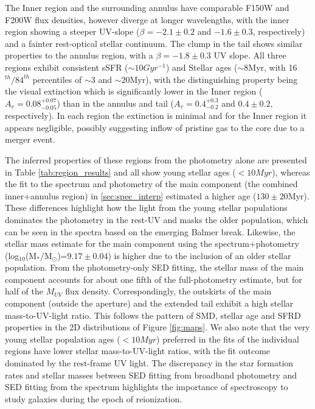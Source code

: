 \documentclass[sn-mathphys]{sn-jnl}%
\theoremstyle{thmstyleone}%
\theoremstyle{thmstyletwo}%
\theoremstyle{thmstylethree}%
\begin{document}
The Inner region and the surrounding annulus have comparable F150W and F200W flux densities, however diverge at longer wavelengths, with the inner region showing a steeper UV-slope ($\beta=-2.1\pm0.2$ and $-1.6\pm0.3$, respectively) and a fainter rest-optical stellar continuum. The clump in the tail shows similar properties to the annulus region, with a $\beta=-1.8\pm0.3$ UV slope.
All three regions exhibit consistent sSFR ($\sim10Gyr^{-1}$) and Stellar ages ($\sim8$Myr, with 16$^{th}/84^{th}$ percentiles of $\sim3$ and $\sim20$Myr), with the distinguishing property being the visual extinction which is significantly lower in the Inner region ($A_v = 0.08^{+0.07}_{-0.05}$) than in the annulus and tail ($A_v = 0.4^{+0.3}_{-0.2}$ and $0.4\pm0.2$, respectively). 
In each region the extinction is minimal and for the Inner region it appears negligible, possibly suggesting inflow of pristine gas to the core due to a merger event. 

The inferred properties of these regions from the photometry alone are presented in Table \ref{tab:region_results} and all show young stellar ages ($<10Myr$), whereas the fit to the spectrum and photometry of the main component (the combined inner+annulus region) in \ref{sec:spec_interp} estimated a higher age ($130\pm20$Myr). These differences highlight how the light from the young stellar populations dominates the photometry in the rest-UV and masks the older population, which can be seen in the spectra based on the emerging Balmer break.
Likewise, the stellar mass estimate for the main component using the spectrum+photometry (log$_{10}$(M$_*/$M$_\odot$)=$9.17\pm0.04$) is higher due to the inclusion of an older stellar population. 
From the photometry-only SED fitting, the stellar mass of the main component accounts for about one fifth of the full-photometry estimate, but for half of the $M_{UV}$ flux density. Correspondingly, the outskirts of the main component (outside the aperture) and the extended tail exhibit a high stellar mass-to-UV-light ratio. This follows the pattern of SMD, stellar age and SFRD properties in the 2D distributions of Figure \ref{fig:maps}. We also note that the very young stellar population ages ($<10Myr$) preferred in the fits of the individual regions have lower stellar mass-to-UV-light ratios, with the fit outcome dominated by the rest-frame UV light. The discrepancy in the star formation rates and stellar masses between SED fitting from broadband photometry and SED fitting from the spectrum highlights the importance of spectroscopy to study galaxies during the epoch of reionization. 
 
\end{document}
